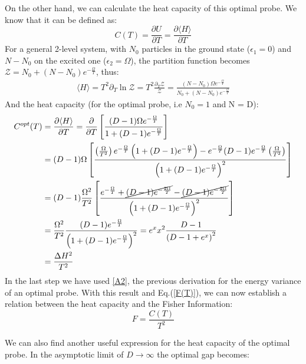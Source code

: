 \documentclass{article}
\begin{document}
\vspace{0.3cm}
On the other hand, we can calculate the heat capacity of this optimal probe. We know that it can be defined as:
\begin{equation}
    C(T)=\frac{\partial U}{\partial T}=\frac{\partial\langle H \rangle }{\partial T}
\end{equation}
For a general 2-level system, with $N_0$ particles in the ground state ($\epsilon_1=0$) and $N-N_0$ on the excited one ($\epsilon_2=\Omega$), the partition function becomes $\mathcal{Z}=N_0+(N-N_0)e^{-\frac{\Omega}{T}}$, thus:
\begin{align}
   \langle H \rangle=T^2\partial_T\ln{\mathcal{Z}}=T^2\frac{\partial_T\mathcal{Z}}{\mathcal{Z}}=\frac{(N-N_0)\Omega e^{-\frac{\Omega}{T}}}{N_0+(N-N_0)e^{-\frac{\Omega}{T}}}
   \label{expectedH_general}
\end{align}
And the heat capacity (for the optimal probe, i.e $N_0 = 1$ and N = D):
\begin{align}
    C^{opt}(T)&= \frac{\partial\langle H \rangle }{\partial T} = \frac{\partial}{\partial T}\left[\frac{(D-1)\Omega e^{-\frac{\Omega}{T}}}{1+(D-1)e^{-\frac{\Omega}{T}}}\right]\notag\\
    &=(D-1)\Omega\left[\frac{\left(\frac{\Omega}{T^2}\right) e^{-\frac{\Omega}{T}}\left(1+(D-1)e^{-\frac{\Omega}{T}}\right)-e^{-\frac{\Omega}{T}}(D-1)e^{-\frac{\Omega}{T}}\left(\frac{\Omega}{T^2}\right)}{\left(1+(D-1)e^{-\frac{\Omega}{T}}\right)^2}\right]\notag\\
    &=(D-1)\frac{\Omega^2}{T^2}\left[\frac{e^{-\frac{\Omega}{T}}+\cancel{(D-1)e^{-\frac{2\Omega}{T}}}-\cancel{(D-1)e^{-\frac{2\Omega}{T}}}}{\left(1+(D-1)e^{-\frac{\Omega}{T}}\right)^2}\right]\notag\\
    &=\frac{\Omega^2}{T^2}\frac{(D-1)e^{-\frac{\Omega}{T}}}{\left(1+(D-1)e^{-\frac{\Omega}{T}}\right)^2}=e^x x^2\frac{D-1}{\left(D-1+e^{x}\right)^2} \label{C_opt_T}\\
    &=\frac{\Delta H^2}{T^2}
    \label{C-H}
\end{align}
In the last step we have used \ref{A2}, the previous derivation for the energy variance of an optimal probe. With this result and Eq.(\ref{F(T)}), we can now establish a relation between the heat capacity and the Fisher Information:
\begin{equation}
    F=\frac{C(T)}{T^2}
\end{equation}
\par
We can also find another useful expression for the heat capacity of the optimal probe. In the asymptotic limit of $D\rightarrow\infty$ the optimal gap becomes:
\end{document}
